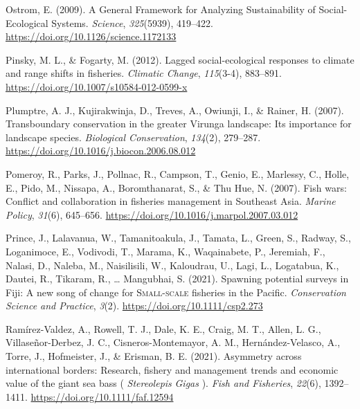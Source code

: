 \documentclass[
  12pt,
]{article}
\newlength{\cslhangindent}
\newlength{\cslentryspacingunit} %
\newenvironment{CSLReferences}[2] %
 {%
  \setlength{\parindent}{0pt}
  \ifodd #1
  \let\oldpar\par
  \def\par{\hangindent=\cslhangindent\oldpar}
  \fi
  \setlength{\parskip}{#2\cslentryspacingunit}
 }%
 {}
\begin{document}
\begin{CSLReferences}{1}{2}
\leavevmode{}%
Ostrom, E. (2009). A {General Framework} for {Analyzing Sustainability} of {Social-Ecological Systems}. \emph{Science}, \emph{325}(5939), 419--422. \url{https://doi.org/10.1126/science.1172133}

\leavevmode{}%
Pinsky, M. L., \& Fogarty, M. (2012). Lagged social-ecological responses to climate and range shifts in fisheries. \emph{Climatic Change}, \emph{115}(3-4), 883--891. \url{https://doi.org/10.1007/s10584-012-0599-x}

\leavevmode{}%
Plumptre, A. J., Kujirakwinja, D., Treves, A., Owiunji, I., \& Rainer, H. (2007). Transboundary conservation in the greater {Virunga} landscape: {Its} importance for landscape species. \emph{Biological Conservation}, \emph{134}(2), 279--287. \url{https://doi.org/10.1016/j.biocon.2006.08.012}

\leavevmode{}%
Pomeroy, R., Parks, J., Pollnac, R., Campson, T., Genio, E., Marlessy, C., Holle, E., Pido, M., Nissapa, A., Boromthanarat, S., \& Thu Hue, N. (2007). Fish wars: {Conflict} and collaboration in fisheries management in {Southeast Asia}. \emph{Marine Policy}, \emph{31}(6), 645--656. \url{https://doi.org/10.1016/j.marpol.2007.03.012}

\leavevmode{}%
Prince, J., Lalavanua, W., Tamanitoakula, J., Tamata, L., Green, S., Radway, S., Loganimoce, E., Vodivodi, T., Marama, K., Waqainabete, P., Jeremiah, F., Nalasi, D., Naleba, M., Naisilisili, W., Kaloudrau, U., Lagi, L., Logatabua, K., Dautei, R., Tikaram, R., \ldots{} Mangubhai, S. (2021). Spawning potential surveys in {Fiji}: {A} new song of change for {\textsc{Small-scale}} fisheries in the {Pacific}. \emph{Conservation Science and Practice}, \emph{3}(2). \url{https://doi.org/10.1111/csp2.273}

\leavevmode{}%
Ramírez-Valdez, A., Rowell, T. J., Dale, K. E., Craig, M. T., Allen, L. G., Villaseñor-Derbez, J. C., Cisneros-Montemayor, A. M., Hernández-Velasco, A., Torre, J., Hofmeister, J., \& Erisman, B. E. (2021). Asymmetry across international borders: {Research}, fishery and management trends and economic value of the giant sea bass ( {\emph{Stereolepis}}{ \emph{Gigas}} ). \emph{Fish and Fisheries}, \emph{22}(6), 1392--1411. \url{https://doi.org/10.1111/faf.12594}


\end{CSLReferences}
\end{document}
